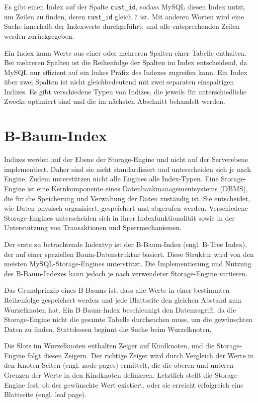 Es gibt einen Index auf der Spalte \texttt{cust\_id}, sodass MySQL diesen Index nutzt, um Zeilen zu finden, deren \texttt{cust\_id} gleich 7 ist.
Mit anderen Worten wird eine Suche innerhalb der Indexwerte durchgeführt, und alle entsprechenden Zeilen werden zurückgegeben.

Ein Index kann Werte aus einer oder mehreren Spalten einer Tabelle enthalten.
Bei mehreren Spalten ist die Reihenfolge der Spalten im Index entscheidend, da MySQL nur effizient auf ein linkes Präfix des Indexes zugreifen kann.
Ein Index über zwei Spalten ist nicht gleichbedeutend mit zwei separaten einspaltigen Indizes.
Es gibt verschiedene Typen von Indizes, die jeweils für unterschiedliche Zwecke optimiert sind und die im nächsten Abschnitt behandelt werden.

\section{B-Baum-Index}

Indizes werden auf der Ebene der Storage-Engine und nicht auf der Serverebene implementiert.
Daher sind sie nicht standardisiert und unterscheiden sich je nach Engine.
Zudem unterstützen nicht alle Engines alle Index-Typen.
Eine Storage-Engine ist eine Kernkomponente eines Datenbankmanagementsystems (DBMS), die für die Speicherung und Verwaltung der Daten zuständig ist.
Sie entscheidet, wie Daten physisch organisiert, gespeichert und abgerufen werden.
Verschiedene Storage-Engines unterscheiden sich in ihrer Indexfunktionalität sowie in der Unterstützung von Transaktionen und Sperrmechanismen.

Der erste zu betrachtende Indextyp ist der B-Baum-Index (engl. B-Tree Index), der auf einer speziellen Baum-Datenstruktur basiert.
Diese Struktur wird von den meisten MySQL-Storage-Engines unterstützt.
Die Implementierung und Nutzung des B-Baum-Indexes kann jedoch je nach verwendeter Storage-Engine variieren.

Das Grundprinzip eines B-Baums ist, dass alle Werte in einer bestimmten Reihenfolge gespeichert werden und jede Blattseite den gleichen Abstand zum Wurzelknoten hat.
Ein B-Baum-Index beschleunigt den Datenzugriff, da die Storage-Engine nicht die gesamte Tabelle durchsuchen muss, um die gewünschten Daten zu finden.
Stattdessen beginnt die Suche beim Wurzelknoten.

Die Slots im Wurzelknoten enthalten Zeiger auf Kindknoten, und die Storage-Engine folgt diesen Zeigern.
Der richtige Zeiger wird durch Vergleich der Werte in den Knoten-Seiten (engl. node pages) ermittelt, die die oberen und unteren Grenzen der Werte in den Kindknoten definieren.
Letztlich stellt die Storage-Engine fest, ob der gewünschte Wert existiert, oder sie erreicht erfolgreich eine Blattseite (engl. leaf page).

